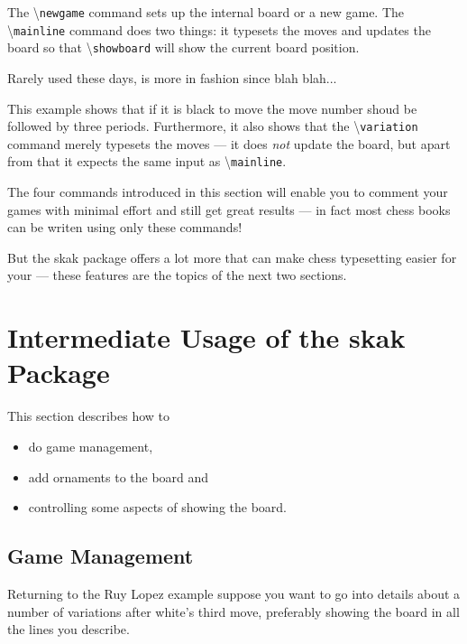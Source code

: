 \documentclass[10pt]{article}
\makeatletter
\renewcommand\showboard{\print@board}
\let\ORIshowboard\showboard
\renewcommand\showboard{%
    \makebox[8\squarelength]{%
    \rule{0pt}{9\squarelength}%
    \begin{postscript}%
    [trim = \squarelength{} 0pt \squarelength{} 0pt]
    \ORIshowboard
    \end{postscript}}}
\newcommand{\package}[1]{\textsf{#1}}
\newcommand{\command}[1]{\textbackslash\texttt{#1}}
\makeatother
\begin{document}
The \command{newgame} command sets up the internal board or a new
game. The \command{mainline} command does two things: it typesets the
moves and updates the board so that \command{showboard} will show the
current board position.

\begin{LTXexample}
 
Rarely used these days,
 is more in
fashion since blah blah...

\showboard
\end{LTXexample}



This example shows that if it is black to move the move number shoud
be followed by three periods. Furthermore, it also shows that the
\command{variation} command merely typesets the moves --- it does
\emph{not} update the board, but apart from that it expects the same
input as \command{mainline}.

The four commands introduced in this section will enable you to
comment your games with minimal effort and still get great results ---
in fact most chess books can be writen using only these commands!

But the \package{skak} package offers a lot more that can make chess
typesetting easier for your --- these features are the topics of the
next two sections.



\section{Intermediate Usage of the \package{skak} Package}
\label{sec:intermediate}

This section describes how to
\begin{itemize}
\item do game management,
\item add ornaments to the board and
\item controlling some aspects of showing the board.
\end{itemize}


\subsection{Game Management}
\label{sec:game-management}

Returning to the Ruy Lopez example suppose you want to go into details
about a number of variations after white's third move, preferably
showing the board in all the lines you describe.
\end{document}
